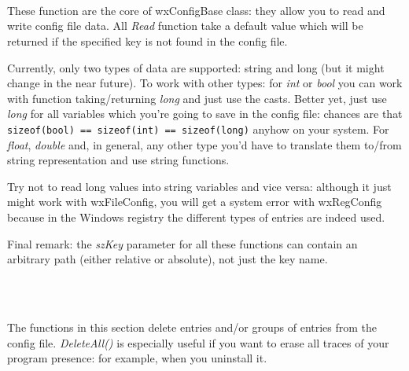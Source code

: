 
\\
\\
\\


These function are the core of wxConfigBase class: they allow you to read and
write config file data. All {\it Read} function take a default value which
will be returned if the specified key is not found in the config file.

Currently, only two types of data are supported: string and long (but it might
change in the near future). To work with other types: for {\it int} or {\it
bool} you can work with function taking/returning {\it long} and just use the
casts. Better yet, just use {\it long} for all variables which you're going to
save in the config file: chances are that \verb$sizeof(bool) == sizeof(int) == sizeof(long)$ anyhow on your system. For {\it float}, {\it double} and, in
general, any other type you'd have to translate them to/from string
representation and use string functions.

Try not to read long values into string variables and vice versa: although it
just might work with wxFileConfig, you will get a system error with
wxRegConfig because in the Windows registry the different types of entries are
indeed used.

Final remark: the {\it szKey} parameter for all these functions can contain an
arbitrary path (either relative or absolute), not just the key name.

\\
\\


The functions in this section delete entries and/or groups of entries from the
config file. {\it DeleteAll()} is especially useful if you want to erase all
traces of your program presence: for example, when you uninstall it.

\\
\\

